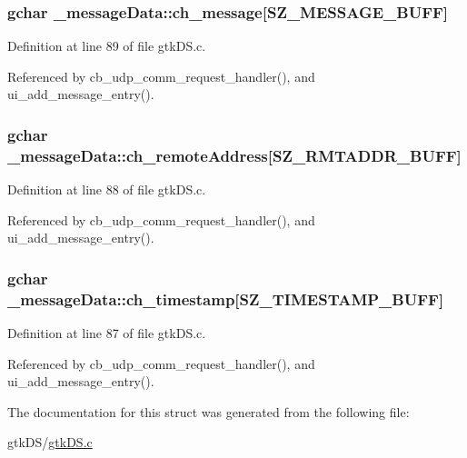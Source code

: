 \subsubsection[{ch\+\_\+message}]{\setlength{\rightskip}{0pt plus 5cm}gchar \+\_\+message\+Data\+::ch\+\_\+message\mbox{[}{\bf S\+Z\+\_\+\+M\+E\+S\+S\+A\+G\+E\+\_\+\+B\+U\+F\+F}\mbox{]}}\label{struct__message_data_a26366c3de6b85c0312117e42a46093e8}


Definition at line 89 of file gtk\+D\+S.\+c.



Referenced by cb\+\_\+udp\+\_\+comm\+\_\+request\+\_\+handler(), and ui\+\_\+add\+\_\+message\+\_\+entry().

\hypertarget{struct__message_data_ad7d54fd9c1f9c0f8f6592ba194d6106f}{}
\subsubsection[{ch\+\_\+remote\+Address}]{\setlength{\rightskip}{0pt plus 5cm}gchar \+\_\+message\+Data\+::ch\+\_\+remote\+Address\mbox{[}{\bf S\+Z\+\_\+\+R\+M\+T\+A\+D\+D\+R\+\_\+\+B\+U\+F\+F}\mbox{]}}\label{struct__message_data_ad7d54fd9c1f9c0f8f6592ba194d6106f}


Definition at line 88 of file gtk\+D\+S.\+c.



Referenced by cb\+\_\+udp\+\_\+comm\+\_\+request\+\_\+handler(), and ui\+\_\+add\+\_\+message\+\_\+entry().

\hypertarget{struct__message_data_a34854aba2033bcf0a48c1915b84452bf}{}
\subsubsection[{ch\+\_\+timestamp}]{\setlength{\rightskip}{0pt plus 5cm}gchar \+\_\+message\+Data\+::ch\+\_\+timestamp\mbox{[}{\bf S\+Z\+\_\+\+T\+I\+M\+E\+S\+T\+A\+M\+P\+\_\+\+B\+U\+F\+F}\mbox{]}}\label{struct__message_data_a34854aba2033bcf0a48c1915b84452bf}


Definition at line 87 of file gtk\+D\+S.\+c.



Referenced by cb\+\_\+udp\+\_\+comm\+\_\+request\+\_\+handler(), and ui\+\_\+add\+\_\+message\+\_\+entry().



The documentation for this struct was generated from the following file\+:\begin{DoxyCompactItemize}
\item 
gtk\+D\+S/\hyperlink{gtk_d_s_8c}{gtk\+D\+S.\+c}\end{DoxyCompactItemize}
